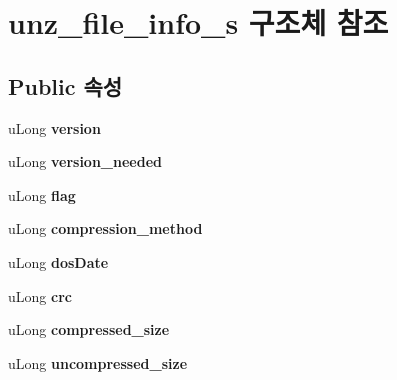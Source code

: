 \hypertarget{structunz__file__info__s}{}\section{unz\+\_\+file\+\_\+info\+\_\+s 구조체 참조}
\label{structunz__file__info__s}
\subsection*{Public 속성}
\begin{DoxyCompactItemize}
\item 
\mbox{\label{structunz__file__info__s_a635f933b26b636d8314cef61af62fcef}} 
u\+Long {\bfseries version}
\item 
\mbox{\label{structunz__file__info__s_a1578aca2bb7fed658f9f94c78d00288e}} 
u\+Long {\bfseries version\+\_\+needed}
\item 
\mbox{\label{structunz__file__info__s_adff7171a3114d55e5532c593b1779ecc}} 
u\+Long {\bfseries flag}
\item 
\mbox{\label{structunz__file__info__s_aaaca88f0ebec5c1cfebb436b8e70a774}} 
u\+Long {\bfseries compression\+\_\+method}
\item 
\mbox{\label{structunz__file__info__s_a14bd7da84cada0f4b1455d60274eef91}} 
u\+Long {\bfseries dos\+Date}
\item 
\mbox{\label{structunz__file__info__s_a6d741cb2df07794d7a4794841148893b}} 
u\+Long {\bfseries crc}
\item 
\mbox{\label{structunz__file__info__s_a35ee9d733879c87565e40a545fe46fb6}} 
u\+Long {\bfseries compressed\+\_\+size}
\item 
\mbox{\label{structunz__file__info__s_a7696a98511bc57e389485e5313a9c2bf}} 
u\+Long {\bfseries uncompressed\+\_\+size}
\item 
\mbox{\label{structunz__file__info__s_ae4f2f81a5301f7df9014838a56a496c6}} 

\end{DoxyCompactItemize}
